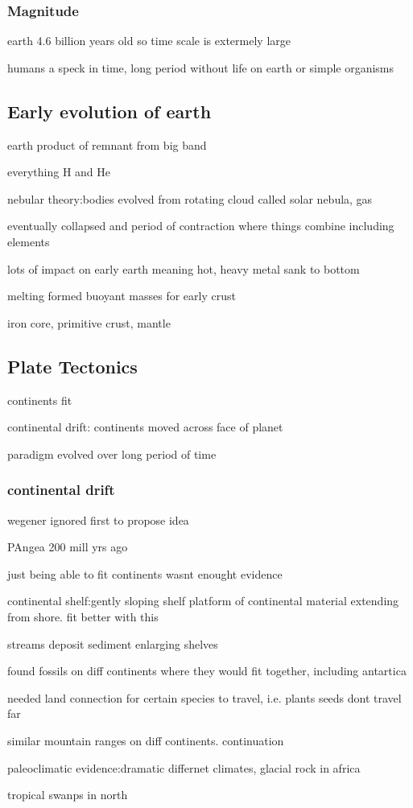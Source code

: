 \documentclass[11pt]{amsart}
\begin{document}
  \subsubsection{Magnitude}
  \par earth 4.6 billion years old so time scale is extermely large
  \par humans a speck in time, long period without life on earth or simple
  organisms
  \subsection{Early evolution of earth}
  \par earth product of remnant from big band
  \par everything H and He
  \par nebular theory:bodies evolved from rotating cloud called solar nebula,
  gas
  \par eventually collapsed and period of contraction where things combine
  including elements
  \par lots of impact on early earth meaning hot, heavy metal sank to bottom
  \par melting formed buoyant masses for early crust
  \par iron core, primitive crust, mantle
  \subsection{Plate Tectonics}
  \par continents fit
  \par continental drift: continents moved across face of planet
  \par paradigm evolved over long period of time
  \subsubsection{continental drift}
  \par wegener ignored first to propose idea
  \par PAngea 200 mill yrs ago
  \par just being able to fit continents wasnt enought evidence
  \par continental shelf:gently sloping shelf platform of continental
  material extending from shore. fit better with this
  \par streams deposit sediment enlarging shelves
  \par found fossils on diff continents where they would fit together,
  including antartica
  \par needed land connection for certain species to travel, i.e. plants seeds
  dont travel far
  \par similar mountain ranges on diff continents. continuation
  \par paleoclimatic evidence:dramatic differnet climates, glacial rock in
  africa
  \par tropical swanps in north
\end{document}
